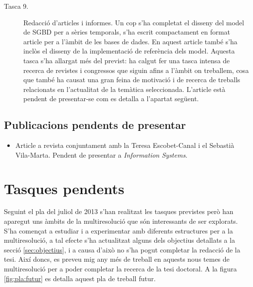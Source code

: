 \begin{description}
\item[Tasca 9.] Redacció d'articles i informes. Un cop s'ha completat el
  disseny del model de SGBD per a sèries temporals, s'ha escrit
  compactament en format article per a l'àmbit de les bases de dades.
  En aquest article també s'ha inclòs el disseny de la implementació
  de referència dels model.  Aquesta tasca s'ha allargat més del
  previst: ha calgut fer una tasca intensa de recerca de revistes i
  congressos que siguin afins a l'àmbit on treballem, cosa que també
  ha causat una gran feina de motivació i de recerca de treballs
  relacionats en l'actualitat de la temàtica seleccionada.  L'article
  està pendent de presentar-se com es detalla a l'apartat següent.


\end{description}







\subsection{Publicacions pendents de presentar}
\todo{}

\begin{itemize}

\item Article a revista conjuntament amb la Teresa Escobet-Canal i el
  Sebastià Vila-Marta. Pendent de presentar a \emph{Information Systems}.

\end{itemize}




\section{Tasques pendents}

\todo{}

Seguint el pla del juliol de 2013 s'han realitzat les tasques
previstes però han aparegut uns àmbits de la multiresolució que són
interessants de ser explorats. S'ha començat a estudiar i a
experimentar amb diferents estructures per a la multiresolució, a tal
efecte s'ha actualitzat alguns dels objectius detallats a la secció
\ref{sec:objectius}, i a causa d'això no s'ha pogut completar la
redacció de la tesi. Així doncs, es preveu mig any més de treball en
aquests nous temes de multiresolució per a poder completar la recerca
de la tesi doctoral.  A la figura \ref{fig:pla:futur} es detalla aquest
pla de treball futur.




